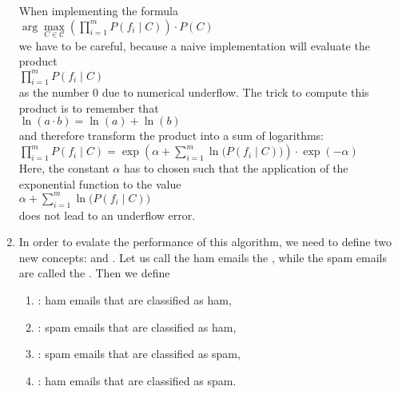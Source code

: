 \begin{enumerate}
      When implementing the formula 
      \\[0.2cm]
      \hspace*{1.3cm}
      $\arg\max\limits_{C \in \mathcal{C}}  \left(\prod\limits_{i=1}^m P(f_i \;|\; C)\right) \cdot P(C) $
      \\[0.2cm]
      we have to be careful, because a naive implementation will evaluate the product
      \\[0.2cm]
      \hspace*{1.3cm}
      $\prod\limits_{i=1}^m P(f_i \;|\; C)$
      \\[0.2cm]
      as the number $0$ due to numerical underflow.  The trick to compute this product is to remember that
      \\[0.2cm]
      \hspace*{1.3cm}
      $ \ln(a \cdot b) = \ln(a) + \ln(b) $
      \\[0.2cm]
      and therefore transform the product into a sum of logarithms:
      \\[0.2cm]
      \hspace*{1.3cm}
      $ \prod\limits_{i=1}^m P(f_i \;|\; C) = \exp\left(\alpha + \sum\limits_{i=1}^m \ln\bigl(P(f_i \;|\; C)\bigr) \right) \cdot \exp(-\alpha)$
      \\[0.2cm]
      Here, the constant $\alpha$ has to chosen such that the application of the exponential function to the value
      \\[0.2cm]
      \hspace*{1.3cm}
      $ \alpha + \sum\limits_{i=1}^m \ln\bigl(P(f_i \;|\; C)\bigr) $
      \\[0.2cm]
      does not lead to an underflow error.
\item In order to evalate the performance of this algorithm, we need to define two new concepts:  and 
      .  Let us call the ham emails the , while the spam emails are called the
      .  Then we define
      \begin{enumerate}
      \item {}: ham emails that are classified as ham,
      \item {}: spam emails that are classified as ham,
      \item {}: spam emails that are classified as spam,
      \item {}: ham emails that are classified as spam.
      \end{enumerate}

\end{enumerate}
